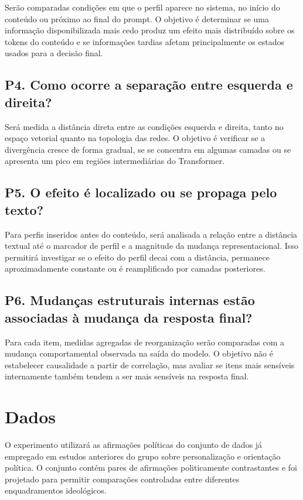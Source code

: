 \documentclass[11pt,a4paper]{article}
\begin{document}
Serão comparadas condições em que o perfil aparece no sistema, no início do conteúdo ou próximo ao final do prompt. O objetivo é determinar se uma informação disponibilizada mais cedo produz um efeito mais distribuído sobre os tokens do conteúdo e se informações tardias afetam principalmente os estados usados para a decisão final.

\subsection*{P4. Como ocorre a separação entre esquerda e direita?}

Será medida a distância direta entre as condições esquerda e direita, tanto no espaço vetorial quanto na topologia das redes. O objetivo é verificar se a divergência cresce de forma gradual, se se concentra em algumas camadas ou se apresenta um pico em regiões intermediárias do Transformer.

\subsection*{P5. O efeito é localizado ou se propaga pelo texto?}

Para perfis inseridos antes do conteúdo, será analisada a relação entre a distância textual até o marcador de perfil e a magnitude da mudança representacional. Isso permitirá investigar se o efeito do perfil decai com a distância, permanece aproximadamente constante ou é reamplificado por camadas posteriores.

\subsection*{P6. Mudanças estruturais internas estão associadas à mudança da resposta final?}

Para cada item, medidas agregadas de reorganização serão comparadas com a mudança comportamental observada na saída do modelo. O objetivo não é estabelecer causalidade a partir de correlação, mas avaliar se itens mais sensíveis internamente também tendem a ser mais sensíveis na resposta final.

\section{Dados}

O experimento utilizará as afirmações políticas do conjunto de dados já empregado em estudos anteriores do grupo sobre personalização e orientação política. O conjunto contém pares de afirmações politicamente contrastantes e foi projetado para permitir comparações controladas entre diferentes enquadramentos ideológicos.
\end{document}
